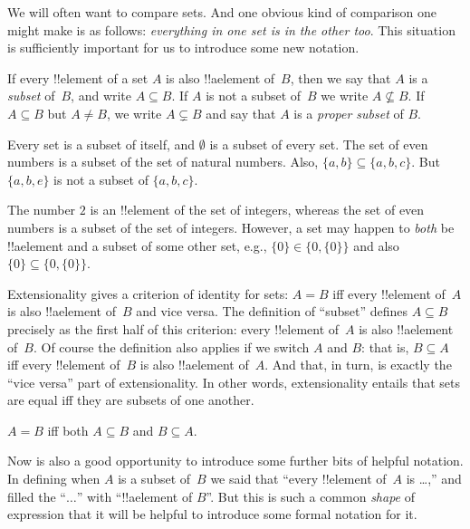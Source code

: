 \documentclass[../../../include/open-logic-section]{subfiles}
\begin{document}

\begin{explain}
We will often want to compare sets. And one obvious kind of comparison
one might make is as follows: \emph{everything in one set is in the
other too}. This situation is sufficiently important for us to
introduce some new notation.
\end{explain}

\begin{defn}[Subset]
If every !!{element} of a set $A$ is also !!a{element} of~$B$, then we
say that $A$ is a \emph{subset} of~$B$, and write $A \subseteq B$. If
$A$ is not a subset of~$B$ we write $A \not\subseteq B$.
If $A \subseteq B$ but $A \neq B$, we write $A \subsetneq B$ and say
that $A$ is a \emph{proper subset} of $B$.
\end{defn}

\begin{ex}
Every set is a subset of itself, and $\emptyset$ is a subset of every
set. The set of even numbers is a subset of the set of natural
numbers. Also, $\{ a, b \} \subseteq \{ a, b, c \}$. But $\{ a, b, e
\}$ is not a subset of $\{ a, b, c \}$.
\end{ex}

\begin{ex}
The number $2$ is an !!{element} of the set of integers, whereas the
set of even numbers is a subset of the set of integers. However, a set
may happen to \emph{both} be !!a{element} and a subset of some other
set, e.g., $\{0\} \in \{0, \{0\}\}$ and also $\{0\} \subseteq \{0,
\{0\}\}$.
\end{ex}

Extensionality gives a criterion of identity for sets: $A = B$ iff
every !!{element} of~$A$ is also !!a{element} of~$B$ and vice versa.
The definition of ``subset'' defines $A \subseteq B$ precisely as the
first half of this criterion: every !!{element} of~$A$ is also
!!a{element} of~$B$. Of course the definition also applies if we
switch $A$ and $B$: that is, $B \subseteq A$ iff every !!{element}
of~$B$ is also !!a{element} of~$A$. And that, in turn, is exactly the
``vice versa'' part of extensionality. In other words, extensionality
entails that sets are equal iff they are subsets of one another.

\begin{prop}
$A = B$ iff both $A \subseteq B$ and $B \subseteq A$.
\end{prop}

Now is also a good opportunity to introduce some further bits of
helpful notation. In defining when $A$ is a subset of~$B$ we said that
``every !!{element} of~$A$ is \dots,'' and filled the ``$\dots$'' with
``!!a{element} of $B$''. But this is such a common \emph{shape} of
expression that it will be helpful to introduce some formal notation
for it.
\end{document}
